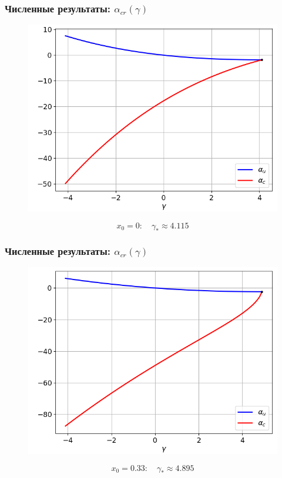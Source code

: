 \documentclass[fullscreen=true, unicode, bookmarks=false]{beamer}
\begin{document}
\begin{frame}
\frametitle{ Численные результаты: $ \alpha_{cr}(\gamma) $ }

\begin{figure} 
\includegraphics[scale=0.55]{alphas_0.png}  
\end{figure}

$$ x_0 = 0: \quad \gamma_* \approx 4.115 $$

\end{frame}

\begin{frame}
\frametitle{ Численные результаты: $ \alpha_{cr}(\gamma) $ }

\begin{figure} 
\includegraphics[scale=0.55]{alphas_13.png}  
\end{figure}

$$ x_0 = 0.33: \quad \gamma_* \approx 4.895 $$

\end{frame}
\end{document}
